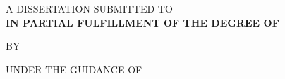 \makeatletter
\begin{titlepage}
    \begin{center}
        \Large{\textbf{\MakeUppercase{\@title}}}
        
        \vspace{40pt}
        \normalsize
        \uppercase{A dissertation submitted to}\\
        \vspace{10pt}
        \textbf{\MakeTextUppercase{\@institution\space in partial fulfillment of the degree of}}\\
        \vspace{10pt}
        \Large
        \textbf{\MakeTextUppercase{\@course}}
        
        \vspace{50pt}
        \normalsize
        BY\\
        \Large
        \textbf{\MakeTextUppercase{\@author}}
        
        \vspace{40pt}
        
        \normalsize
        \uppercase{Under the guidance of}\\
        \Large
        \textbf{\@guide}
        
        \normalsize
        \vspace{40pt}
        \MakeTextUppercase{\@department}

        \vspace{40pt}
        \textbf{\MakeTextUppercase{\@date}}
    \end{center}
\end{titlepage}
\makeatother